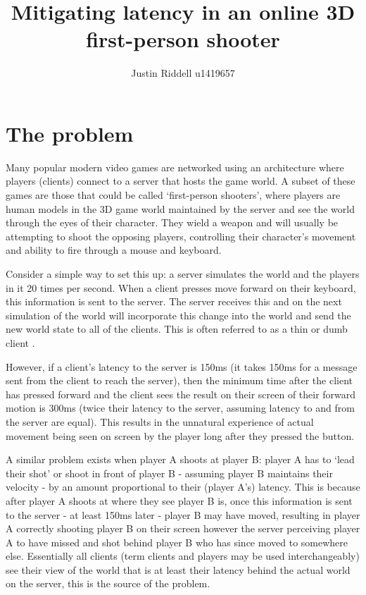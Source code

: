\documentclass{article}
\title{Mitigating latency in an online 3D first-person shooter}
\author{Justin Riddell u1419657}
\begin{document}
\maketitle

\section{The problem}

	Many popular modern video games are networked using an architecture where players (clients) connect to a server that hosts the game world. A subset of these games are those that could be called `first-person shooters', where players are human models in the 3D game world maintained by the server and see the world through the eyes of their character. They wield a weapon and will usually be attempting to shoot the opposing players, controlling their character's movement and ability to fire through a mouse and keyboard.

	Consider a simple way to set this up: a server simulates the world and the players in it 20 times per second. When a client presses move forward on their keyboard, this information is sent to the server. The server receives this and on the next simulation of the world will incorporate this change into the world and send the new world state to all of the clients. This is often referred to as a thin or dumb client \cite[Page~2]{Bernier}.
	
	However, if a client's latency to the server is 150ms (it takes 150ms for a message sent from the client to reach the server), then the minimum time after the client has pressed forward and the client sees the result on their screen of their forward motion is 300ms (twice their latency to the server, assuming latency to and from the server are equal). This results in the unnatural experience of actual movement being seen on screen by the player long after they pressed the button.

	A similar problem exists when player A shoots at player B: player A has to `lead their shot' or shoot in front of player B - assuming player B maintains their velocity - by an amount proportional to their (player A's) latency. This is because after player A shoots at where they see player B is, once this information is sent to the server - at least 150ms later - player B may have moved, resulting in player A correctly shooting player B on their screen however the server perceiving player A to have missed and shot behind player B who has since moved to somewhere else. Essentially all clients (term clients and players may be used interchangeably) see their view of the world that is at least their latency behind the actual world on the server, this is the source of the problem.
\end{document}
